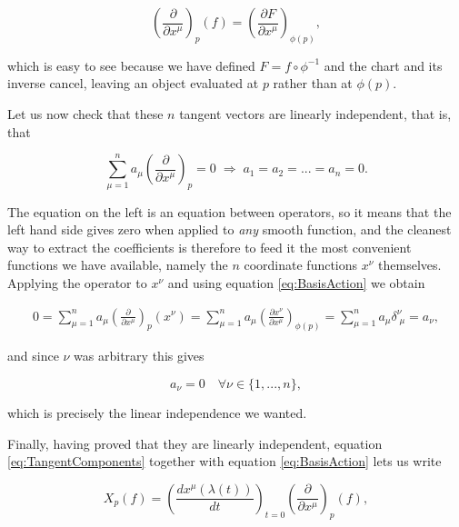         \begin{equation}\label{eq:BasisAction}
            \left(\frac{\partial}{\partial x^{\mu}}\right)_p(f) = \left(\frac{\partial F}{\partial x^{\mu}}\right)_{\phi(p)},
        \end{equation}

        which is easy to see because we have defined $F = f \circ \phi^{-1}$ and the chart and its inverse cancel, leaving an object evaluated at $p$ rather than at $\phi(p)$.

        Let us now check that these $n$ tangent vectors are linearly independent, that is, that

        \begin{equation}
            \sum_{\mu=1}^n a_{\mu}\left(\frac{\partial}{\partial x^{\mu}}\right)_p = 0 \;\Longrightarrow\; a_1 = a_2 = ... = a_n = 0.
        \end{equation}

        The equation on the left is an equation between operators, so it means that the left hand side gives zero when applied to \textit{any} smooth function, and the cleanest way to extract the coefficients is therefore to feed it the most convenient functions we have available, namely the $n$ coordinate functions $x^{\nu}$ themselves. Applying the operator to $x^{\nu}$ and using equation \ref{eq:BasisAction} we obtain

        \begin{align*}
            0 = \sum_{\mu=1}^n a_{\mu}\left(\frac{\partial}{\partial x^{\mu}}\right)_p(x^{\nu}) = \sum_{\mu=1}^n a_{\mu}\left(\frac{\partial x^{\nu}}{\partial x^{\mu}}\right)_{\phi(p)} = \sum_{\mu=1}^n a_{\mu}\delta^{\nu}_{\;\mu} = a_{\nu},
        \end{align*}

        and since $\nu$ was arbitrary this gives

        \begin{equation}
            a_{\nu} = 0 \quad \forall \nu \in \{1,...,n\},
        \end{equation}

        which is precisely the linear independence we wanted.

        Finally, having proved that they are linearly independent, equation \ref{eq:TangentComponents} together with equation \ref{eq:BasisAction} lets us write

        \begin{equation}
            X_p(f) = \left(\frac{dx^{\mu}(\lambda(t))}{dt}\right)_{t=0}\left(\frac{\partial}{\partial x^{\mu}}\right)_p(f),
        \end{equation}

